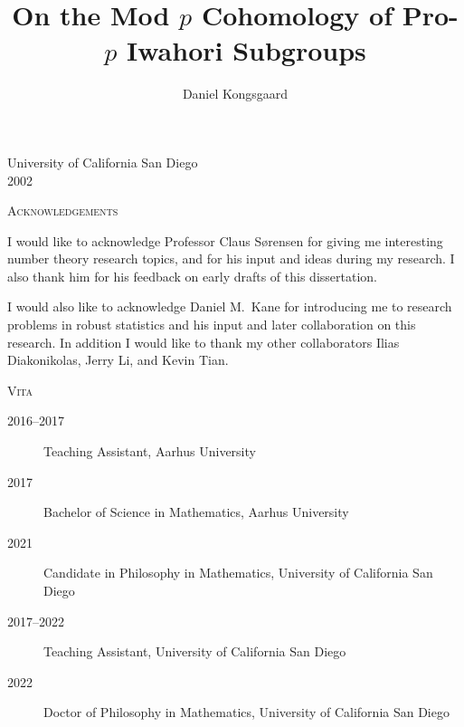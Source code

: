 \documentclass[letterpaper,oneside,english,11pt,openany]{memoir}
\title{On the Mod \texorpdfstring{$p$}{p} Cohomology of Pro-\texorpdfstring{$p$}{p} Iwahori Subgroups}
\author{Daniel Kongsgaard}
\begin{document}
\DoubleSpacing




\frontmatter

\setcounter{page}{3}



\vfill

\begin{center}
  {\large University of California San Diego} \\[1em]
  {\large 2002}
\end{center}

\clearpage

\tableofcontents

\clearpage

\printnomenclature[4cm]

\clearpage

\listoftables

\clearpage


\begin{center}
  \Large\scshape Acknowledgements
\end{center}

I would like to acknowledge Professor Claus Sørensen for giving me interesting number theory research topics, and for his input and ideas during my research. I also thank him for his feedback on early drafts of this dissertation.

I would also like to acknowledge Daniel M.\ Kane for introducing me to research problems in robust statistics and his input and later collaboration on this research. In addition I would like to thank my other collaborators Ilias Diakonikolas, Jerry Li, and Kevin Tian.

\clearpage



\begin{center}
  \Large\scshape Vita
\end{center}
\begin{description}
  \item[2016--2017] Teaching Assistant, Aarhus University
  \item[2017] Bachelor of Science in Mathematics, Aarhus University
  \item[2021] Candidate in Philosophy in Mathematics, University of California San Diego
  \item[2017--2022] Teaching Assistant, University of California San Diego
  \item[2022] Doctor of Philosophy in Mathematics, University of California San Diego
\end{description}
\end{document}
